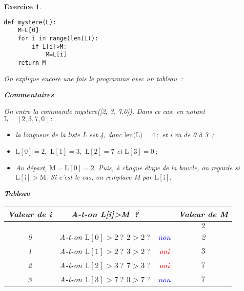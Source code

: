 \documentclass[10pt]{article}
\newtheorem{exo}{Exercice}
\begin{document}
\begin{exo}


~{}

\begin{lstlisting}
def mystere(L):
	M=L[0]
	for i in range(len(L)):
		if L[i]>M:
			M=L[i]
	return M
\end{lstlisting}




On explique encore une fois le programme avec un tableau~:

\medskip

\item \setlength{\columnseprule}{1pt}

\begin{multicols}{2}




\begin{center}
\textbf{Commentaires}
\end{center}


\medskip

On entre la commande mystere([2, 3, 7,0]). Dans ce cas, en notant $\text{L}=\left[2,3,7,0\right]~:$

\medskip

\begin{itemize}
\item[\textbullet] la longueur de la liste L est 4, donc $\text{len(L)}=4~;$ et i va de 0 à 3~;
\item[\textbullet] $\text{L}\left[0\right]=2,$ $\text{L}\left[1\right]=3,$ $\text{L}\left[2\right]=7$ et $\text{L}\left[3\right]=0~;$
\item[\textbullet] Au départ, $\text{M}=\text{L}\left[0\right]=2.$ Puis, à chaque étape de la boucle, on regarde si $\text{L}\left[\text{i}\right]>\text{M}.$ Si c'est le cas, on remplace M par $\text{L}\left[\text{i}\right].$
\end{itemize}



\columnbreak

\begin{center}
\textbf{Tableau}
\end{center}

\begin{center}



\begin{tabular}{|c|cc|c|} \hline
\textbf{Valeur de i}&\textbf{A-t-on L[i]>M~?}& & \textbf{Valeur de M}\\ \hline
\cellcolor{gray}&\cellcolor{gray}&\cellcolor{gray} &$2$\\ \hline
0&  A-t-on $\text{L}\left[0\right]>2~?$ $2>2~?$ &\textcolor{blue}{non}&2\\ \hline
1& A-t-on $\text{L}\left[1\right]>2~?$ $3>2~?$ &\textcolor{red}{oui}&$3$\\ \hline
2& A-t-on $\text{L}\left[2\right]>3~?$ $7>3~?$ &\textcolor{red}{oui}&$7$\\ \hline
3& A-t-on $\text{L}\left[3\right]>7~?$ $0>7~?$ &\textcolor{blue}{non}&$7$\\ \hline
\end{tabular}
\end{center}


\end{multicols}
\end{exo}
\end{document}
